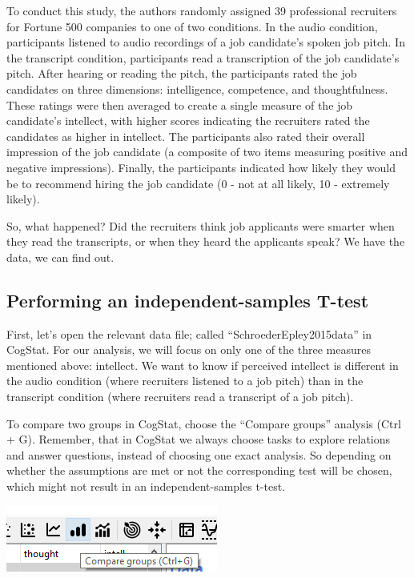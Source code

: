 \documentclass[
]{book}
\begin{document}
To conduct this study, the authors randomly assigned 39 professional recruiters for Fortune 500 companies to one of two conditions. In the audio condition, participants listened to audio recordings of a job candidate's spoken job pitch. In the transcript condition, participants read a transcription of the job candidate's pitch. After hearing or reading the pitch, the participants rated the job candidates on three dimensions: intelligence, competence, and thoughtfulness. These ratings were then averaged to create a single measure of the job candidate's intellect, with higher scores indicating the recruiters rated the candidates as higher in intellect. The participants also rated their overall impression of the job candidate (a composite of two items measuring positive and negative impressions). Finally, the participants indicated how likely they would be to recommend hiring the job candidate (0 - not at all likely, 10 - extremely likely).

So, what happened? Did the recruiters think job applicants were smarter when they read the transcripts, or when they heard the applicants speak? We have the data, we can find out.

\hypertarget{performing-an-independent-samples-t-test-1}{%
\subsection{Performing an independent-samples T-test}\label{performing-an-independent-samples-t-test-1}}

First, let's open the relevant data file; called ``SchroederEpley2015data'' in CogStat. For our analysis, we will focus on only one of the three measures mentioned above: intellect. We want to know if perceived intellect is different in the audio condition (where recruiters listened to a job pitch) than in the transcript condition (where recruiters read a transcript of a job pitch).

To compare two groups in CogStat, choose the ``Compare groups'' analysis (Ctrl + G). Remember, that in CogStat we always choose tasks to explore relations and answer questions, instead of choosing one exact analysis. So depending on whether the assumptions are met or not the corresponding test will be chosen, which might not result in an independent-samples t-test.

\includegraphics{img/ch7/7.3comparegroups_icon.png}
\end{document}
